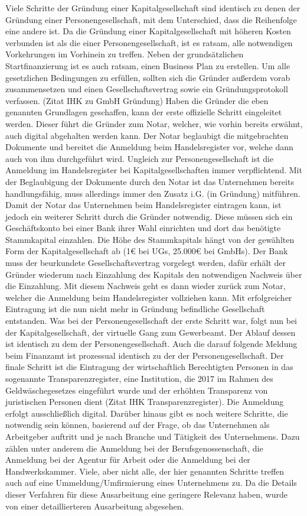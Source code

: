 Viele Schritte der Gründung einer Kapitalgesellschaft sind identisch zu denen der Gründung einer Personengesellschaft, mit dem Unterschied, dass die Reihenfolge eine andere ist. Da die Gründung einer Kapitalgesellschaft mit höheren Kosten verbunden ist als die einer Personengesellschaft, ist es ratsam, alle notwendigen Vorkehrungen im Vorhinein zu treffen. Neben der grundsätzlichen Startfinanzierung ist es auch ratsam, einen Business Plan zu erstellen. Um alle gesetzlichen Bedingungen zu erfüllen, sollten sich die Gründer außerdem vorab zusammensetzen und einen Gesellschaftsvertrag sowie ein Gründungsprotokoll verfassen. (Zitat IHK zu GmbH Gründung) Haben die Gründer die eben genannten Grundlagen geschaffen, kann der erste offizielle Schritt eingeleitet werden. Dieser führt die Gründer zum Notar, welcher, wie vorhin bereits erwähnt, auch digital abgehalten werden kann. Der Notar beglaubigt die mitgebrachten Dokumente und bereitet die Anmeldung beim Handelsregister vor, welche dann auch von ihm durchgeführt wird. Ungleich zur Personengesellschaft ist die Anmeldung im Handelsregister bei Kapitalgesellschaften immer verpflichtend. Mit der Beglaubigung der Dokumente durch den Notar ist das Unternehmen bereits handlungsfähig, muss allerdings immer den Zusatz i.G. (in Gründung) mitführen. Damit der Notar das Unternehmen beim Handelsregister eintragen kann, ist jedoch ein weiterer Schritt durch die Gründer notwendig. Diese müssen sich ein Geschäftskonto bei einer Bank ihrer Wahl einrichten und dort das benötigte Stammkapital einzahlen. Die Höhe des Stammkapitals hängt von der gewählten Form der Kapitalgesellschaft ab (1€ bei UGs, 25.000€ bei GmbHs). Der Bank muss der beurkundete Gesellschaftsvertrag vorgelegt werden, dafür erhält der Gründer wiederum nach Einzahlung des Kapitals den notwendigen Nachweis über die Einzahlung. Mit diesem Nachweis geht es dann wieder zurück zum Notar, welcher die Anmeldung beim Handelsregister vollziehen kann. Mit erfolgreicher Eintragung ist die nun nicht mehr in Gründung befindliche Gesellschaft entstanden. Was bei der Personengesellschaft der erste Schritt war, folgt nun bei der Kapitalgesellschaft, der virtuelle Gang zum Gewerbeamt. Der Ablauf dessen ist identisch zu dem der Personengesellschaft. Auch die darauf folgende Meldung beim Finanzamt ist prozessual identisch zu der der Personengesellschaft. Der finale Schritt ist die Eintragung der wirtschaftlich Berechtigten Personen in das sogenannte Transparenzregister, eine Institution, die 2017 im Rahmen des Geldwäschegesetzes eingeführt wurde und der erhöhten Transparenz von juristischen Personen dient (Zitat IHK Transparenzregister). Die Anmeldung erfolgt ausschließlich digital. Darüber hinaus gibt es noch weitere Schritte, die notwendig sein können, basierend auf der Frage, ob das Unternehmen als Arbeitgeber auftritt und je nach Branche und Tätigkeit des Unternehmens. Dazu zählen unter anderem die Anmeldung bei der Berufsgenossenschaft, die Anmeldung bei der Agentur für Arbeit oder die Anmeldung bei der Handwerkskammer. Viele, aber nicht alle, der hier genannten Schritte treffen auch auf eine Ummeldung/Umfirmierung eines Unternehmens zu. Da die Details dieser Verfahren für diese Ausarbeitung eine geringere Relevanz haben, wurde von einer detaillierteren Ausarbeitung abgesehen.